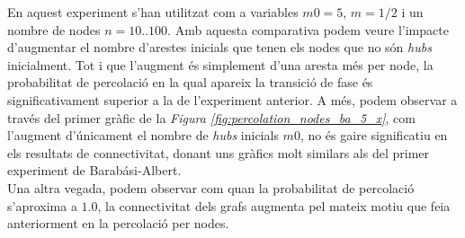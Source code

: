 \documentclass[a4paper]{article}
\begin{document}
	En aquest experiment s'han utilitzat com a variables $m0 = 5$, $m = 1/2$ i un nombre de nodes $n = 10..100$. Amb aquesta comparativa podem veure l'impacte d'augmentar el nombre d'arestes inicials que tenen els nodes que no són \textit{hubs} inicialment. Tot i que l'augment és simplement d'una aresta més per node, la probabilitat de percolació en la qual apareix la transició de fase és significativament superior a la de l'experiment anterior. A més, podem observar a través del primer gràfic de la \textit{Figura \ref{fig:percolation_nodes_ba_5_x}}, com l'augment d'únicament el nombre de \textit{hubs} inicials $m0$, no és gaire significatiu en els resultats de connectivitat, donant uns gràfics molt similars als del primer experiment de Barabási-Albert. \\

	Una altra vegada, podem observar com quan la probabilitat de percolació s'aproxima a $1.0$, la connectivitat dels grafs augmenta pel mateix motiu que feia anteriorment en la percolació per nodes.
\end{document}
